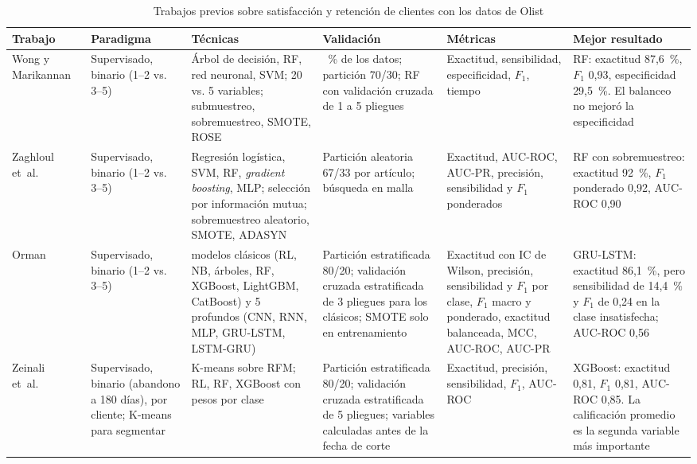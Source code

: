 \documentclass[journal]{IEEEtran}
\begin{document}
\begin{table}[!t]
\centering
\caption{Trabajos previos sobre satisfacción y retención de clientes con los datos de Olist}
\label{tab:sota}
\footnotesize
\begin{tabularx}{\textwidth}{@{}>{\raggedright\arraybackslash}p{2.1cm}>{\raggedright\arraybackslash}p{2.2cm}>{\raggedright\arraybackslash}X>{\raggedright\arraybackslash}p{3.4cm}>{\raggedright\arraybackslash}p{2.8cm}>{\raggedright\arraybackslash}X@{}}
\toprule
Trabajo & Paradigma & Técnicas & Validación & Métricas & Mejor resultado \\
\midrule
Wong y Marikannan~\cite{wong2020} & Supervisado, binario (1--2 vs. 3--5) & Árbol de decisión, RF, red neuronal, SVM; 20 vs. 5 variables; submuestreo, sobremuestreo, SMOTE, ROSE & 50~\% de los datos; partición 70/30; RF con validación cruzada de 1 a 5 pliegues & Exactitud, sensibilidad, especificidad, $F_1$, tiempo & RF: exactitud 87,6~\%, $F_1$ 0,93, especificidad 29,5~\%. El balanceo no mejoró la especificidad \\
\addlinespace
Zaghloul et~al.~\cite{zaghloul2024} & Supervisado, binario (1--2 vs. 3--5) & Regresión logística, SVM, RF, \emph{gradient boosting}, MLP; selección por información mutua; sobremuestreo aleatorio, SMOTE, ADASYN & Partición aleatoria 67/33 por artículo; búsqueda en malla & Exactitud, AUC-ROC, AUC-PR, precisión, sensibilidad y $F_1$ ponderados & RF con sobremuestreo: exactitud 92~\%, $F_1$ ponderado 0,92, AUC-ROC 0,90 \\
\addlinespace
Orman~\cite{orman2026} & Supervisado, binario (1--2 vs. 3--5) & 8 modelos clásicos (RL, NB, árboles, RF, XGBoost, LightGBM, CatBoost) y 5 profundos (CNN, RNN, MLP, GRU-LSTM, LSTM-GRU) & Partición estratificada 80/20; validación cruzada estratificada de 3 pliegues para los clásicos; SMOTE solo en entrenamiento & Exactitud con IC de Wilson, precisión, sensibilidad y $F_1$ por clase, $F_1$ macro y ponderado, exactitud balanceada, MCC, AUC-ROC, AUC-PR & GRU-LSTM: exactitud 86,1~\%, pero sensibilidad de 14,4~\% y $F_1$ de 0,24 en la clase insatisfecha; AUC-ROC 0,56 \\
\addlinespace
Zeinali et~al.~\cite{zeinali2026} & Supervisado, binario (abandono a 180 días), por cliente; K-means para segmentar & K-means sobre RFM; RL, RF, XGBoost con pesos por clase & Partición estratificada 80/20; validación cruzada estratificada de 5 pliegues; variables calculadas antes de la fecha de corte & Exactitud, precisión, sensibilidad, $F_1$, AUC-ROC & XGBoost: exactitud 0,81, $F_1$ 0,81, AUC-ROC 0,85. La calificación promedio es la segunda variable más importante \\
\bottomrule
\end{tabularx}
\end{table}
\end{document}
